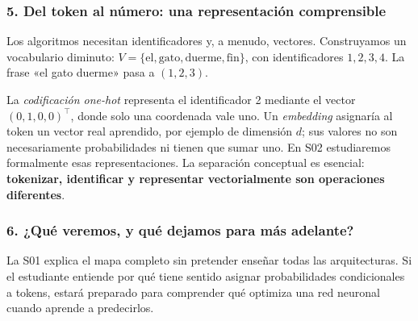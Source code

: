 \subsubsection*{5. Del token al número: una representación comprensible}
Los algoritmos necesitan identificadores y, a menudo, vectores. Construyamos un vocabulario diminuto: $V=\{\text{el},\text{gato},\text{duerme},\text{fin}\}$, con identificadores $1,2,3,4$. La frase «el gato duerme» pasa a $(1,2,3)$.
\begin{center}
\end{center}
La \emph{codificación one-hot} representa el identificador 2 mediante el vector $(0,1,0,0)^\top$, donde solo una coordenada vale uno. Un \emph{embedding} asignaría al token un vector real aprendido, por ejemplo de dimensión $d$; sus valores no son necesariamente probabilidades ni tienen que sumar uno. En S02 estudiaremos formalmente esas representaciones. La separación conceptual es esencial: \textbf{tokenizar, identificar y representar vectorialmente son operaciones diferentes}.

\subsubsection*{6. ¿Qué veremos, y qué dejamos para más adelante?}
\begin{center}
\end{center}
La S01 explica el mapa completo sin pretender enseñar todas las arquitecturas. Si el estudiante entiende por qué tiene sentido asignar probabilidades condicionales a tokens, estará preparado para comprender qué optimiza una red neuronal cuando aprende a predecirlos.
\clearpage

